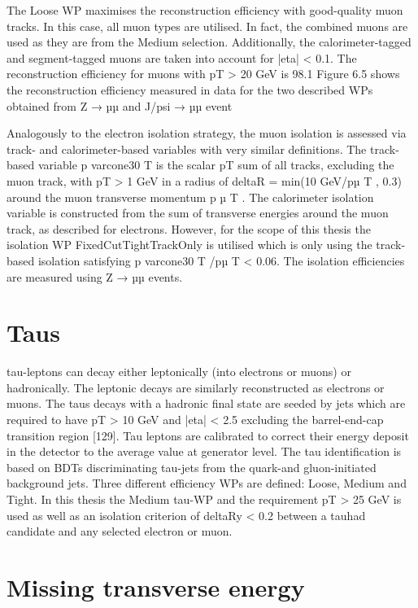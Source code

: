 The Loose WP maximises the reconstruction efficiency with good-quality muon tracks. In this case,
all muon types are utilised. In fact, the combined muons are used as they are from the Medium
selection. Additionally, the calorimeter-tagged and segment-tagged muons are taken into account for
|eta| < 0.1. The reconstruction efficiency for muons with pT > 20 GeV is 98.1%
Figure 6.5 shows the reconstruction efficiency measured in data for the two described WPs obtained
from Z → µµ and J/psi → µµ event

Analogously to the electron isolation strategy, the muon isolation is assessed via track- and calorimeter-based variables with very similar definitions. The track-based variable p
varcone30
T
is the scalar pT sum
of all tracks, excluding the muon track, with pT > 1 GeV in a radius of deltaR = min(10 GeV/pµ
T
, 0.3)
around the muon transverse momentum p
µ
T
. The calorimeter isolation variable is constructed from
the sum of transverse energies around the muon track, as described for electrons. However, for the
scope of this thesis the isolation WP FixedCutTightTrackOnly is utilised which is only using the
track-based isolation satisfying p
varcone30
T
/pµ
T < 0.06. The isolation efficiencies are measured using
Z → µµ events.

\section{Taus}

tau-leptons can decay either leptonically (into electrons or muons) or hadronically. The leptonic decays
are similarly reconstructed as electrons or muons. The taus decays with a hadronic final state are seeded
by jets which are required to have pT > 10 GeV and |eta| < 2.5 excluding the barrel-end-cap transition
region [129]. Tau leptons are calibrated to correct their energy deposit in the detector to the average
value at generator level. The tau identification is based on BDTs discriminating tau-jets from the quark-and gluon-initiated background jets. Three different efficiency WPs are defined: Loose, Medium
and Tight. In this thesis the Medium tau-WP and the requirement pT > 25 GeV is used as well as an
isolation criterion of deltaRy < 0.2 between a tauhad candidate and any selected electron or muon.

\section{Missing transverse energy}

